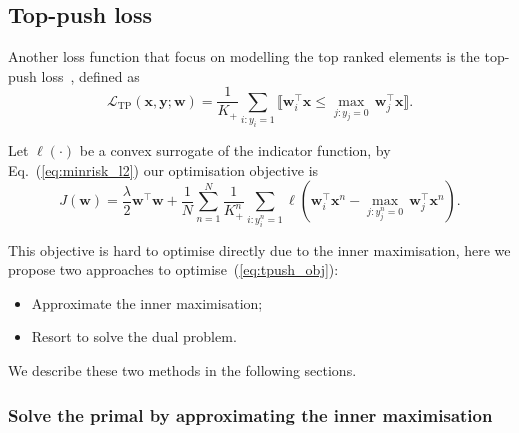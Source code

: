 \documentclass[9pt]{extarticle}
\newcommand{\llb}{\llbracket}
\newcommand{\rrb}{\rrbracket}
\newcommand{\x}{\mathbf{x}}
\newcommand{\y}{\mathbf{y}}
\newcommand{\1}{\mathbf{1}}
\newcommand{\w}{\mathbf{w}}
\newcommand{\LCal}{\mathcal{L}}
\begin{document}
\subsection{Top-push loss}
\label{ssec:tpush}

Another loss function that focus on modelling the top ranked elements is the top-push loss~\cite{li2014top}, defined as
\begin{equation}
\label{eq:tpush_loss}
\LCal_\text{TP}(\x, \y; \w) = \frac{1}{K_+} \sum_{i:y_i=1} \llb \w_i^\top \x \le \underset{j:y_j=0}{\max} \, \w_j^\top \x \rrb.
\end{equation}

Let $\ell(\cdot)$ be a convex surrogate of the indicator function, by Eq.~(\ref{eq:minrisk_l2}) our optimisation objective is
\begin{equation}
\label{eq:tpush_obj}
J(\w) = \frac{\lambda}{2} \w^\top \w + \frac{1}{N} \sum_{n=1}^N 
        \frac{1}{K_+^n} \sum_{i:y_i^n=1} \ell \left( \w_i^\top \x^n - \underset{j:y_j^n=0}{\max} \, \w_j^\top \x^n \right).
\end{equation}

This objective is hard to optimise directly due to the inner maximisation,
here we propose two approaches to optimise~(\ref{eq:tpush_obj}):
\begin{itemize}
\item Approximate the inner maximisation;
\item Resort to solve the dual problem.
\end{itemize}
We describe these two methods in the following sections.

\subsubsection{Solve the primal by approximating the inner maximisation}
\label{sssec:tp_primal}
\end{document}
